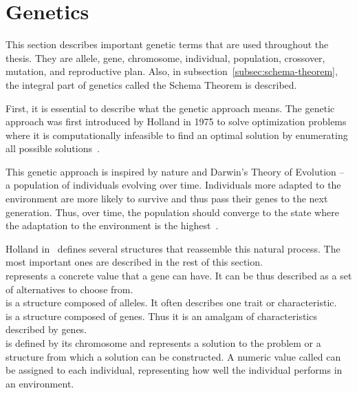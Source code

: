 \section{Genetics}\label{sec:genetics}

This section describes important genetic terms that are used throughout the thesis.
They are allele, gene, chromosome, individual, population, crossover, mutation, and reproductive plan.
Also, in subsection~\ref{subsec:schema-theorem}, the integral part of genetics called the Schema Theorem is described.

First, it is essential to describe what the genetic approach means.
The genetic approach was first introduced by Holland in 1975
to solve optimization problems where it is computationally infeasible to
find an optimal solution by enumerating all possible solutions~\cite{hollandAdaptationNaturalArtificial1975}.

This genetic approach is inspired by nature and Darwin’s Theory of Evolution
– a population of individuals evolving over time.
Individuals more adapted to the environment are
more likely to survive and thus pass their genes to the next generation.
Thus, over time, the population should converge to the state where the adaptation to the environment is the highest~\cite{darwinOriginSpeciesMeans2009}.

Holland in~\cite{hollandAdaptationNaturalArtificial1975} defines several structures that reassemble this natural process.
The most important ones are described in the rest of this section.\\

 represents a concrete value that a gene can have.
It can be thus described as a set of alternatives to choose from. \\

 is a structure composed of alleles.
It often describes one trait or characteristic. \\

 is a structure composed of genes.
Thus it is an amalgam of characteristics described by genes.\\

 is defined by its chromosome and represents a solution to the problem or a structure from which a solution can be constructed.
A numeric value called  can be assigned to each individual, representing how well the individual performs in an environment. \\

